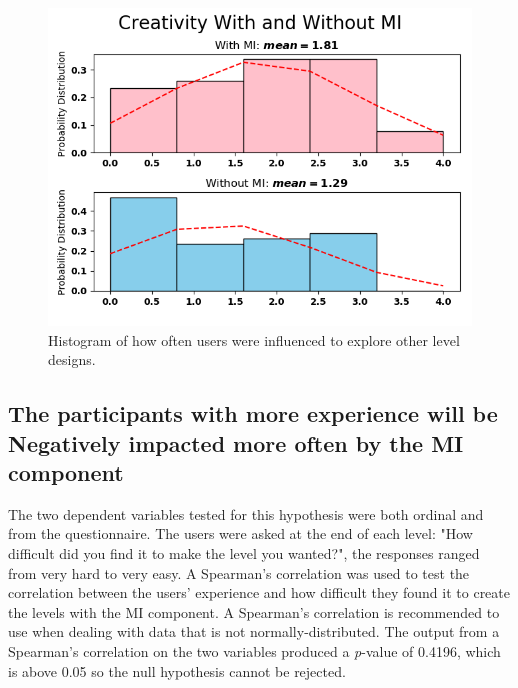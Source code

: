 \documentclass[journal]{IEEEtran}
\begin{document}
\begin{figure}[h]
	\includegraphics[width=1\linewidth]{CreativityWithandWithoutMI.png}
	\caption{Histogram of how often users were influenced to explore other level designs.}
	\label{alterHisto}
\end{figure}
\begin{table}[h]
	\centering
	\caption{Questionnaire Response Numerical Values}
	\label{responsValues}
	\def\arraystretch{2}
\end{table}

\subsection{The participants with more experience will be Negatively impacted more often by the MI component}
The two dependent variables tested for this hypothesis were both ordinal and from the questionnaire. The users were asked at the end of each level: "How difficult did you find it to make the level you wanted?", the responses ranged from very hard to very easy. A Spearman's correlation was used to test the correlation between the users' experience and how difficult they found it to create the levels with the MI component. A Spearman's correlation is recommended to use when dealing with data that is not normally-distributed\cite{o2005step}. The output from a Spearman's correlation on the two variables produced a \textit{p}-value of  0.4196, which is above 0.05 so the null hypothesis cannot be rejected. 
\end{document}
